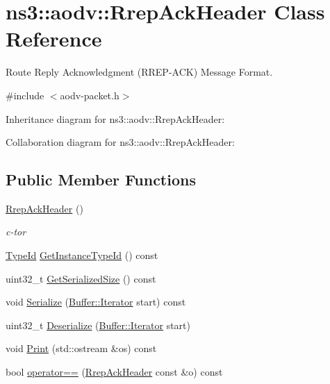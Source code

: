 \hypertarget{classns3_1_1aodv_1_1RrepAckHeader}{}\section{ns3\+:\+:aodv\+:\+:Rrep\+Ack\+Header Class Reference}
\label{classns3_1_1aodv_1_1RrepAckHeader}


Route Reply Acknowledgment (R\+R\+E\+P-\/\+A\+CK) Message Format.  




{\ttfamily \#include $<$aodv-\/packet.\+h$>$}



Inheritance diagram for ns3\+:\+:aodv\+:\+:Rrep\+Ack\+Header\+:


Collaboration diagram for ns3\+:\+:aodv\+:\+:Rrep\+Ack\+Header\+:
\subsection*{Public Member Functions}
\begin{DoxyCompactItemize}
\item 
\hyperlink{classns3_1_1aodv_1_1RrepAckHeader_af0c778d5c8e9e924a6557fed3298af9c}{Rrep\+Ack\+Header} ()
\begin{DoxyCompactList}\small\item\em c-\/tor \end{DoxyCompactList}\item 
\hyperlink{classns3_1_1TypeId}{Type\+Id} \hyperlink{classns3_1_1aodv_1_1RrepAckHeader_a9c901e02706c6eab84b7fb633222cf23}{Get\+Instance\+Type\+Id} () const 
\item 
uint32\+\_\+t \hyperlink{classns3_1_1aodv_1_1RrepAckHeader_a2152a12fb632e585a668d72a03587ee4}{Get\+Serialized\+Size} () const 
\item 
void \hyperlink{classns3_1_1aodv_1_1RrepAckHeader_a01ac20cf68b28a82c9752b809cf4c4e1}{Serialize} (\hyperlink{classns3_1_1Buffer_1_1Iterator}{Buffer\+::\+Iterator} start) const 
\item 
uint32\+\_\+t \hyperlink{classns3_1_1aodv_1_1RrepAckHeader_a1283b1b1b365a0c8fb67cc327dec46d7}{Deserialize} (\hyperlink{classns3_1_1Buffer_1_1Iterator}{Buffer\+::\+Iterator} start)
\item 
void \hyperlink{classns3_1_1aodv_1_1RrepAckHeader_ab43f844a8290dd195fee25036a3dc61f}{Print} (std\+::ostream \&os) const 
\item 
bool \hyperlink{classns3_1_1aodv_1_1RrepAckHeader_a38dd7740cbd971ad771174dc3cfde420}{operator==} (\hyperlink{classns3_1_1aodv_1_1RrepAckHeader}{Rrep\+Ack\+Header} const \&o) const 
\end{DoxyCompactItemize}
